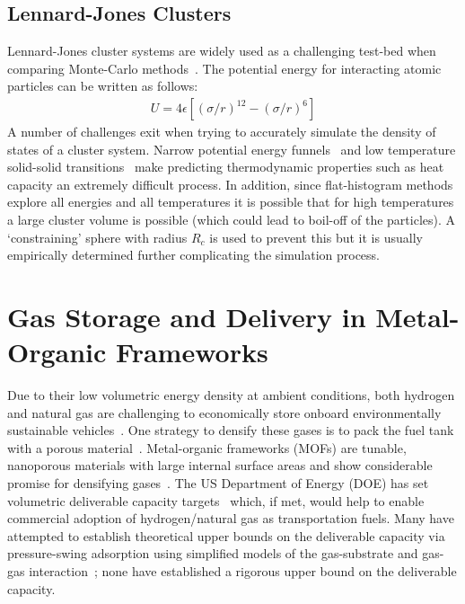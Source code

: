 \subsection{Lennard-Jones Clusters}
Lennard-Jones cluster systems are widely used as a challenging test-bed when comparing Monte-Carlo
methods~\cite{doye1998thermodynamics, poulain2006performances, martiniani2014superposition}. The potential
energy for interacting atomic particles can be written as follows:
\begin{align}
U = 4\epsilon \left[\left( \sigma/r \right)^{12} - \left( \sigma/r \right)^{6}\right]
\end{align}
A number of challenges exit when trying to accurately simulate the density of states of a cluster system.
Narrow potential energy funnels~\cite{mandelshtam2006multiple, wales1997global} and low temperature solid-solid
transitions~\cite{neirotti2000phase, calvo2000phase, calvo2000entropic} make predicting thermodynamic properties
such as heat capacity an extremely difficult process. In addition, since flat-histogram methods explore all
energies and all temperatures it is possible that for high temperatures a large cluster volume is possible
(which could lead to boil-off of the particles). A `constraining' sphere with radius $R_c$ is used to prevent
this but it is usually empirically determined further complicating the simulation process.

\section{Gas Storage and Delivery in Metal-Organic Frameworks}

Due to their low volumetric energy density at ambient conditions, both hydrogen
and natural gas are challenging to economically store onboard environmentally
sustainable vehicles~\cite{mason2014evaluating, sircar2002pressure}. One
strategy to densify these gases is to pack the fuel tank with a porous
material~\cite{?}. Metal-organic frameworks (MOFs) are tunable, nanoporous
materials with large internal surface areas and show considerable promise for
densifying gases~\cite{makal2012methane,mason2014evaluating,
suh2011hydrogen,garcia2018benchmark, schoedel2016role}. The US Department of
Energy (DOE) has set volumetric deliverable capacity targets~\cite{simon2015materials, h2targetsDOE} which, if met, would help to enable 
commercial adoption of hydrogen/natural gas as
transportation fuels. Many have attempted to establish theoretical upper bounds
on the deliverable capacity via pressure-swing adsorption using simplified
models of the gas-substrate and gas-gas interaction~\cite{gomez2014exploring, 
gomez2017impact, kaija2018high, lee2019predicting}; none have
established a rigorous upper bound on the deliverable capacity.

